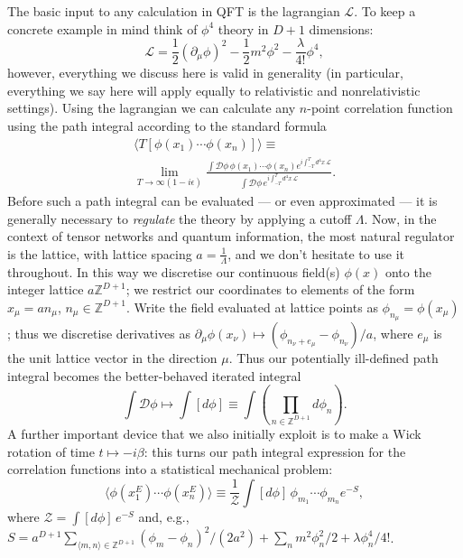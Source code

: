 \documentclass[twocolumn,lengthcheck,superscriptaddress]{revtex4-1}
\theoremstyle{definition}
\theoremstyle{remark}
\begin{document}
The basic input to any calculation in QFT is the lagrangian $\mathcal{L}$. To keep a concrete example in mind think of $\phi^4$ theory in $D+1$ dimensions:
\begin{equation}
	\mathcal{L} = \frac12 (\partial_\mu\phi)^2 - \frac12m^2 \phi^2 -\frac{\lambda}{4!}\phi^4,
\end{equation}
however, everything we discuss here is valid in generality (in particular, everything we say here will apply equally to relativistic and nonrelativistic settings).  Using the lagrangian we can calculate any $n$-point correlation function using the path integral according to the standard formula
\begin{multline}	
	\langle  T[\phi(x_1)\cdots \phi(x_n)] \rangle\equiv\\ \lim_{T\rightarrow \infty(1-i\epsilon)} \frac{\int \mathcal{D}\phi \, \phi(x_1)\cdots \phi(x_n)e^{i\int_{-T}^T d^4x\, \mathcal{L}}}{\int \mathcal{D}\phi\, e^{i\int_{-T}^T d^4x\, \mathcal{L}}}.
\end{multline} 
Before such a path integral can be evaluated --- or even approximated --- it is generally necessary to \emph{regulate} the theory by applying a cutoff $\Lambda$. Now, in the context of tensor networks and quantum information, the most natural regulator is the lattice, with lattice spacing $a = \frac{1}{\Lambda}$, and we don't hesitate to use it throughout. In this way we discretise our continuous field(s) $\phi(x)$ onto the integer lattice $a\mathbb{Z}^{D+1}$; we restrict our coordinates to elements of the form $x_\mu = an_\mu$, $n_\mu \in \mathbb{Z}^{D+1}$. Write the field evaluated at lattice points as $\phi_{n_{\mu}} = \phi(x_\mu)$; thus we discretise derivatives as $\partial_\mu \phi(x_\nu) \mapsto (\phi_{n_\nu + e_{\mu}} - \phi_{n_\nu})/a$,   where $e_\mu$ is the unit lattice vector in the direction $\mu$. Thus our potentially ill-defined path integral becomes the better-behaved iterated integral
\begin{equation}
	\int \mathcal{D}\phi \mapsto \int [d\phi] \equiv \int \left(\prod_{n\in\mathbb{Z}^{D+1}} d\phi_n \right).
\end{equation}
A further important device that we also initially exploit is to make a Wick rotation of time $t\mapsto -i\beta$: this turns our path integral expression for the correlation functions into a statistical mechanical problem:
\begin{equation}\label{eq:wrcorr}
	\langle  \phi(x_{1}^E)\cdots \phi(x_n^E) \rangle\equiv \frac{1}{\mathcal{Z}}\int [d\phi] \, \phi_{m_1}\cdots \phi_{m_n} e^{-S},
\end{equation} 
where $\mathcal{Z} = \int [d\phi] \, e^{-S}$ and, e.g., $S = a^{D+1}\sum_{\langle m,n\rangle\in \mathbb{Z}^{D+1}} (\phi_m-\phi_n)^2/(2a^2) + \sum_{n} m^2\phi_n^2/2 + \lambda \phi_n^4/4!$.
\end{document}
